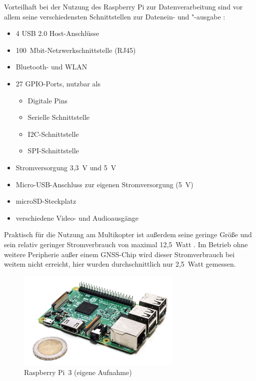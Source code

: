 \documentclass[a4paper,12pt,bibliography=totoc, listof=totoc,titlepage,pointlessnumbers]{scrreprt}
\begin{document}
Vorteilhaft bei der Nutzung des Rasp\-berry Pi zur Datenverarbeitung sind vor allem seine verschiedensten Schnittstellen zur Datenein- und "-ausgabe \citep{raspSheet}:
\begin{itemize}
 \item 4 USB 2.0 Host-Anschlüsse
 \item 100~Mbit-Netzwerkschnittstelle (RJ45)
 \item Bluetooth- und WLAN
 \item 27 GPIO-Ports, nutzbar als \citep{ekRaspPin}
 \begin{itemize} 
  \item Digitale Pins
  \item Serielle Schnittstelle
  \item I2C-Schnittstelle
  \item SPI-Schnittstelle
 \end{itemize}
 \item Strom\-ver\-sor\-gung 3,3~V und 5~V
 \item Micro-USB-Anschluss zur eigenen Strom\-ver\-sor\-gung (5~V)
 \item microSD-Steckplatz 
 \item verschiedene Video- und Audioausgänge
 \end{itemize}

Praktisch für die Nutzung am Multikopter ist außerdem seine geringe Größe und sein relativ geringer Stromverbrauch von maximal 12,5~Watt \citep{raspSheet}. Im Betrieb ohne weitere Peripherie außer einem GNSS-Chip wird dieser Stromverbrauch bei weitem nicht erreicht, hier wurden durchschnittlich nur 2,5~Watt gemessen.

\begin{figure}
 \centering
 \includegraphics[width=0.7\textwidth]{./img/rpi3.jpg}
 \caption{Rasp\-berry Pi~3 (eigene Aufnahme)}
 \label{img:rpi3}
\end{figure}
\end{document}
